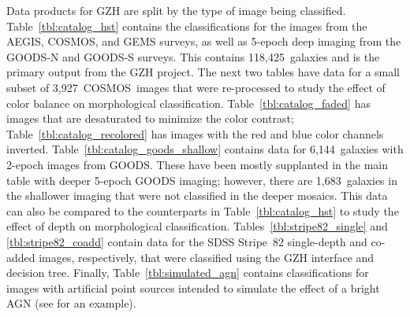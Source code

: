 \documentclass[twocolumn]{aastex6}
\begin{document}
Data products for GZH are split by the type of image being classified. Table~\ref{tbl:catalog_hst} contains the classifications for the \hst{} images from the AEGIS, COSMOS, and GEMS surveys, as well as 5-epoch deep imaging from the GOODS-N and GOODS-S surveys. This contains 118,425~galaxies and is the primary output from the GZH project. The next two tables have data for a small subset of 3,927~COSMOS~images that were re-processed to study the effect of color balance on morphological classification. Table~\ref{tbl:catalog_faded} has images that are desaturated to minimize the color contrast; Table~\ref{tbl:catalog_recolored} has images with the red and blue color channels inverted. Table~\ref{tbl:catalog_goods_shallow} contains data for 6,144~galaxies with 2-epoch images from GOODS. These have been mostly supplanted in the main table with deeper 5-epoch GOODS imaging; however, there are 1,683~galaxies in the shallower imaging that were not classified in the deeper mosaics. This data can also be compared to the counterparts in Table~\ref{tbl:catalog_hst} to study the effect of depth on morphological classification. Tables~\ref{tbl:stripe82_single} and \ref{tbl:stripe82_coadd} contain data for the SDSS Stripe~82 single-depth and co-added images, respectively, that were classified using the GZH interface and decision tree. Finally, Table~\ref{tbl:simulated_agn} contains classifications for images with artificial point sources intended to simulate the effect of a bright AGN (see \citealt{sim14} for an example).
\end{document}

